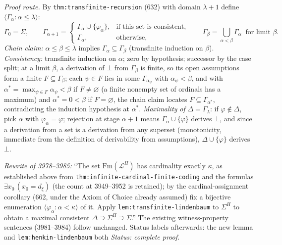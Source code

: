 \emph{Proof route.}  By \texttt{thm:transfinite-recursion} (632) with domain
\(\lambda+1\) define \(\langle\Gamma_\alpha:\alpha\le\lambda\rangle\):
\[
 \Gamma_0=\Sigma,\qquad
 \Gamma_{\alpha+1}=
 \begin{cases}
   \Gamma_\alpha\cup\{\varphi_\alpha\},&\text{if this set is consistent},\\
   \Gamma_\alpha,&\text{otherwise},
 \end{cases}
 \qquad
 \Gamma_\beta=\bigcup_{\alpha<\beta}\Gamma_\alpha\ \text{ for limit }\beta.
\]
\emph{Chain claim:} \(\alpha\le\beta\le\lambda\) implies
\(\Gamma_\alpha\subseteq\Gamma_\beta\) (transfinite induction on \(\beta\)).
\emph{Consistency:} transfinite induction on \(\alpha\); zero by hypothesis;
successor by the case split; at a limit \(\beta\), a derivation of \(\bot\)
from \(\Gamma_\beta\) is finite, so its open assumptions form a finite
\(F\subseteq\Gamma_\beta\); each \(\psi\in F\) lies in some
\(\Gamma_{\alpha_\psi}\) with \(\alpha_\psi<\beta\), and with
\(\alpha^{*}=\max_{\psi\in F}\alpha_\psi<\beta\) if \(F\ne\varnothing\) (a
finite nonempty set of ordinals has a maximum) and \(\alpha^{*}=0<\beta\) if
\(F=\varnothing\), the chain claim locates \(F\subseteq\Gamma_{\alpha^{*}}\),
contradicting the induction hypothesis at \(\alpha^{*}\).  \emph{Maximality of}
\(\Delta=\Gamma_\lambda\): if \(\varphi\notin\Delta\), pick \(\alpha\) with
\(\varphi_\alpha=\varphi\); rejection at stage \(\alpha+1\) means
\(\Gamma_\alpha\cup\{\varphi\}\) derives \(\bot\), and since a derivation from
a set is a derivation from any superset (monotonicity, immediate from the
definition of derivability from assumptions),
\(\Delta\cup\{\varphi\}\) derives \(\bot\).

\emph{Rewrite of 3978--3985:} ``The set \(\mathrm{Fm}(\mathcal{L}^{H})\) has
cardinality exactly \(\kappa\), as established above from
\texttt{thm:infinite-cardinal-finite-coding} and the formulas
\(\exists x_0\,(x_0=d_\xi)\) (the count at 3949--3952 is retained); by the
cardinal-assignment corollary (662, under the Axiom of Choice already assumed)
fix a bijective enumeration
\(\langle\varphi_\alpha:\alpha<\kappa\rangle\) of it.  Apply
\texttt{lem:transfinite-lindenbaum} to \(\Sigma^{H}\) to obtain a maximal
consistent \(\Delta\supseteq\Sigma^{H}\supseteq\Sigma\).''  The existing
witness-property sentences (3981--3984) follow unchanged.  Status labels
afterwards: the new lemma and \texttt{lem:henkin-lindenbaum} both
\textit{Status: complete proof.}


